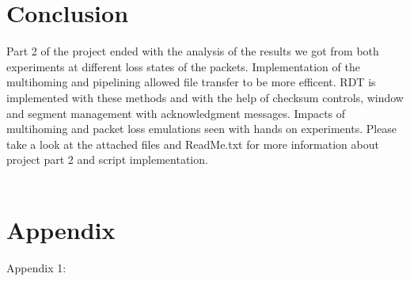 \documentclass[conference]{IEEEtran}
\begin{document}
\section{Conclusion}

Part 2 of the project ended with the analysis of the results we got from both experiments at different loss states of the packets. Implementation of the multihoming and pipelining allowed file transfer to be more efficent. RDT is implemented with these methods and with the help of checksum controls, window and segment management with acknowledgment messages. Impacts of multihoming and packet loss emulations seen with hands on experiments. Please take a look at the attached files and ReadMe.txt for more information about project part 2 and script implementation. \\ \qquad \\

\vspace{\baselineskip}
\vspace{\baselineskip}
\vspace{\baselineskip}
\vspace{\baselineskip}
\vspace{\baselineskip}
\vspace{\baselineskip}
\vspace{\baselineskip}
\vspace{\baselineskip}
\vspace{\baselineskip}
\vspace{\baselineskip}
\vspace{\baselineskip}
\vspace{\baselineskip}
\vspace{\baselineskip}
\vspace{\baselineskip}
\vspace{\baselineskip}
\vspace{\baselineskip}
\vspace{\baselineskip}
\vspace{\baselineskip}

\section{Appendix}

Appendix 1:\\
\end{document}
